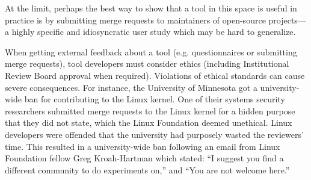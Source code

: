 At the limit, perhaps the
best way to show that a tool in this space is useful in practice is by
submitting merge requests to maintainers of open-source projects---a 
highly specific and idiosyncratic user study which may be hard to generalize.

When getting external feedback about a tool (e.g. questionnaires or
submitting merge requests), tool developers must consider ethics
(including Institutional Review Board approval when required). Violations of ethical
standards can cause severe consequences. For instance, the
University of Minnesota got a university-wide ban for contributing to
the Linux kernel. One of their systems security researchers submitted
merge requests to the Linux kernel for a hidden purpose that they did
not state, which the Linux Foundation deemed
unethical. Linux developers were offended that the university had purposely
wasted the reviewers' time. This resulted in a university-wide ban
following an email from Linux Foundation fellow Greg Kroah-Hartman
which stated: ``I suggest you find a different community to do
experiments on,'' and ``You are not welcome
here.''~\cite{minnesota_banned}








